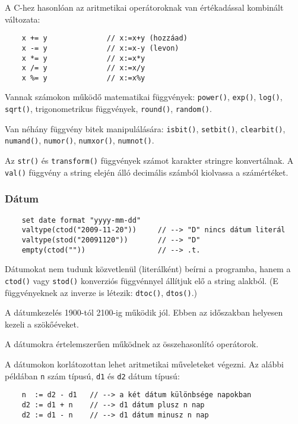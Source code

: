 A C-hez hasonlóan az aritmetikai operátoroknak van  értékadással
kombinált változata:
\begin{verbatim}
    x += y              // x:=x+y (hozzáad)
    x -= y              // x:=x-y (levon)
    x *= y              // x:=x*y
    x /= y              // x:=x/y
    x %= y              // x:=x%y
\end{verbatim}

Vannak számokon működő matematikai függvények:
\verb!power()!,
\verb!exp()!,
\verb!log()!,
\verb!sqrt()!,
trigonometrikus függvények,
\verb!round()!,
\verb!random()!.

Van néhány függvény bitek manipulálására:
\verb!isbit()!,
\verb!setbit()!,
\verb!clearbit()!,
\verb!numand()!,
\verb!numor()!,
\verb!numxor()!,
\verb!numnot()!.

Az \verb!str()! és \verb!transform()! 
függvények számot karakter stringre konvertálnak.
A \verb!val()! függvény  a string elején álló decimális
számból kiolvassa a számértéket.



\subsubsection{Dátum}

\begin{verbatim}
    set date format "yyyy-mm-dd"
    valtype(ctod("2009-11-20"))     // --> "D" nincs dátum literál
    valtype(stod("20091120"))       // --> "D"
    empty(ctod(""))                 // --> .t.
\end{verbatim}

Dátumokat nem tudunk közvetlenül (literálként) beírni a programba,
hanem a \verb!ctod()! vagy \verb!stod()! konverziós függvénnyel állítjuk
elő a string alakból. (E függvényeknek az inverze is létezik: 
\verb!dtoc()!, \verb!dtos()!.)

A dátumkezelés 1900-tól 2100-ig működik jól. Ebben az időszakban
helyesen kezeli a szökőéveket.


A dátumokra értelemszerűen működnek az összehasonlító operátorok.

A dátumokon korlátozottan lehet aritmetikai műveleteket végezni.
Az alábbi példában \verb!n! szám típusú, \verb!d1! és \verb!d2!
dátum típusú:
\begin{verbatim}
    n  := d2 - d1   // --> a két dátum különbsége napokban
    d2 := d1 + n    // --> d1 dátum plusz n nap
    d2 := d1 - n    // --> d1 dátum minusz n nap
\end{verbatim}

